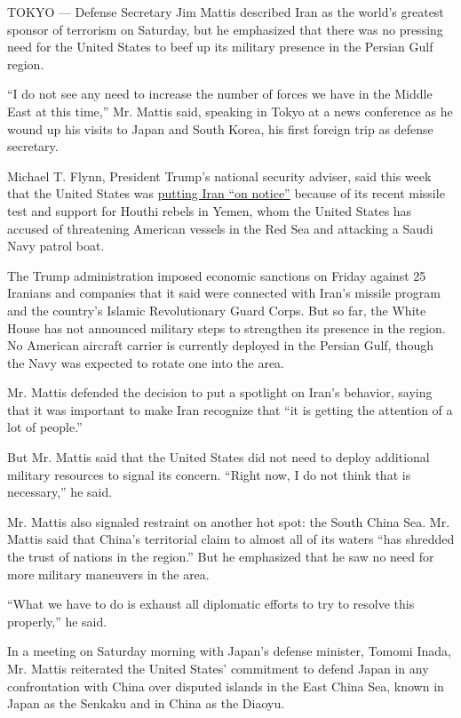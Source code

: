 TOKYO --- Defense Secretary Jim Mattis described Iran as the world's
greatest sponsor of terrorism on Saturday, but he emphasized that there
was no pressing need for the United States to beef up its military
presence in the Persian Gulf region.

``I do not see any need to increase the number of forces we have in the
Middle East at this time,'' Mr. Mattis said, speaking in Tokyo at a news
conference as he wound up his visits to Japan and South Korea, his first
foreign trip as defense secretary.

Michael T. Flynn, President Trump's national security adviser, said this
week that the United States was
\href{https://www.nytimes3xbfgragh.onion/2017/02/01/world/middleeast/iran-missile-test.html}{putting
Iran ``on notice''} because of its recent missile test and support for
Houthi rebels in Yemen, whom the United States has accused of
threatening American vessels in the Red Sea and attacking a Saudi Navy
patrol boat.

The Trump administration imposed economic sanctions on Friday against 25
Iranians and companies that it said were connected with Iran's missile
program and the country's Islamic Revolutionary Guard Corps. But so far,
the White House has not announced military steps to strengthen its
presence in the region. No American aircraft carrier is currently
deployed in the Persian Gulf, though the Navy was expected to rotate one
into the area.

Mr. Mattis defended the decision to put a spotlight on Iran's behavior,
saying that it was important to make Iran recognize that ``it is getting
the attention of a lot of people.''

But Mr. Mattis said that the United States did not need to deploy
additional military resources to signal its concern. ``Right now, I do
not think that is necessary,'' he said.

Mr. Mattis also signaled restraint on another hot spot: the South China
Sea. Mr. Mattis said that China's territorial claim to almost all of its
waters ``has shredded the trust of nations in the region.'' But he
emphasized that he saw no need for more military maneuvers in the area.

``What we have to do is exhaust all diplomatic efforts to try to resolve
this properly,'' he said.

In a meeting on Saturday morning with Japan's defense minister, Tomomi
Inada, Mr. Mattis reiterated the United States' commitment to defend
Japan in any confrontation with China over disputed islands in the East
China Sea, known in Japan as the Senkaku and in China as the Diaoyu.

